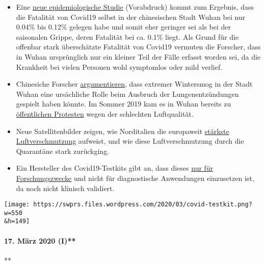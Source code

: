 \begin{itemize}
\tightlist
\item
  Eine
  \href{https://www.medrxiv.org/content/10.1101/2020.02.12.20022434v2}{neue
  epidemiologische Studie} (Vorabdruck) kommt zum Ergebnis, dass die
  Fatalität von Covid19 selbst in der chinesischen Stadt Wuhan bei nur
  0.04\% bis 0.12\% gelegen habe und somit eher geringer sei als bei der
  saisonalen Grippe, deren Fatalität bei ca. 0.1\% liegt. Als Grund für
  die offenbar stark überschätzte Fatalität von Covid19 vermuten die
  Forscher, dass in Wuhan ursprünglich nur ein kleiner Teil der Fälle
  erfasst worden sei, da die Krankheit bei vielen Personen wohl
  symptomlos oder mild verlief.
\item
  Chinesiche Forscher
  \href{https://www.eurasiareview.com/01022020-polluted-air-could-be-an-important-cause-of-wuhan-pneumonia-oped/}{argumentieren},
  dass extremer Wintersmog in der Stadt Wuhan eine ursächliche Rolle
  beim Ausbruch der Lungenentzündungen gespielt haben könnte. Im Sommer
  2019 kam es in Wuhan bereits zu
  \href{https://www.cnn.com/2019/07/10/asia/china-wuhan-pollution-problems-intl-hnk/index.html}{öffentlichen
  Protesten} wegen der schlechten Luftqualität.
\item
  Neue Satellitenbilder zeigen, wie Norditalien die europaweit
  \href{https://twitter.com/esa/status/1238480433047916545}{stärkste
  Luftverschmutzung} aufweist, und wie diese Luftverschmutzung durch die
  Quarantäne stark zurückging.
\item
  Ein Hersteller des Covid19-Testkits gibt an, dass dieses
  \href{https://www.creative-diagnostics.com/sars-cov-2-coronavirus-multiplex-rt-qpcr-kit-277854-457.htm}{nur
  für Forschungszwecke} und nicht für diagnostische Anwendungen
  einzusetzen ist, da noch nicht klinisch validiert.
\end{itemize}

\texttt{[image: https://swprs.files.wordpress.com/2020/03/covid-testkit.png?w=550\\\&h=149]}

\hypertarget{17-muxe4rz-2020-i}{%
\paragraph{17. März 2020 (I)**}\label{17-muxe4rz-2020-i}}

**

